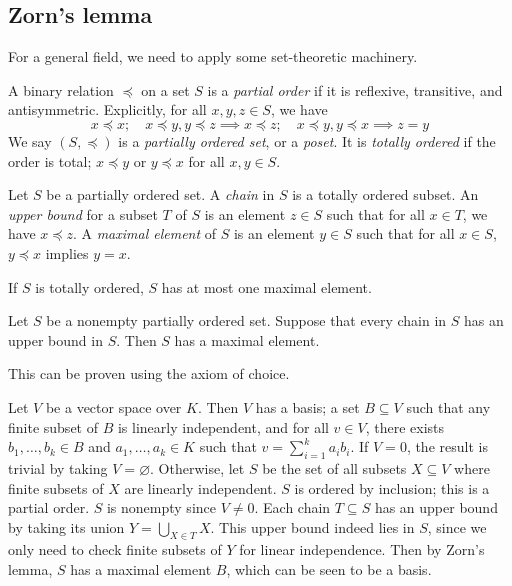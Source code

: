 \subsection{Zorn's lemma}
For a general field, we need to apply some set-theoretic machinery.
\begin{definition}
	A binary relation \( \preceq \) on a set \( S \) is a \emph{partial order} if it is reflexive, transitive, and antisymmetric.
	Explicitly, for all \( x, y, z \in S \), we have
	\[ x \preceq x;\quad x \preceq y, y \preceq z \implies x \preceq z;\quad x \preceq y, y \preceq x \implies z = y \]
	We say \( (S, \preceq) \) is a \emph{partially ordered set}, or a \emph{poset}.
	It is \emph{totally ordered} if the order is total; \( x \preceq y \) or \( y \preceq x \) for all \( x, y \in S \).
\end{definition}
\begin{definition}
	Let \( S \) be a partially ordered set.
	A \emph{chain} in \( S \) is a totally ordered subset.
	An \emph{upper bound} for a subset \( T \) of \( S \) is an element \( z \in S \) such that for all \( x \in T \), we have \( x \preceq z \).
	A \emph{maximal element} of \( S \) is an element \( y \in S \) such that for all \( x \in S \), \( y \preceq x \) implies \( y = x \).
\end{definition}
If \( S \) is totally ordered, \( S \) has at most one maximal element.
\begin{lemma}[Zorn]
	Let \( S \) be a nonempty partially ordered set.
	Suppose that every chain in \( S \) has an upper bound in \( S \).
	Then \( S \) has a maximal element.
\end{lemma}
This can be proven using the axiom of choice.
\begin{example}
	Let \( V \) be a vector space over \( K \).
	Then \( V \) has a basis; a set \( B \subseteq V \) such that any finite subset of \( B \) is linearly independent, and for all \( v \in V \), there exists \( b_1, \dots, b_k \in B \) and \( a_1, \dots, a_k \in K \) such that \( v = \sum_{i=1}^k a_i b_i \).
	If \( V = \qty{0} \), the result is trivial by taking \( V = \varnothing \).
	Otherwise, let \( S \) be the set of all subsets \( X \subseteq V \) where finite subsets of \( X \) are linearly independent.
	\( S \) is ordered by inclusion; this is a partial order.
	\( S \) is nonempty since \( V \neq \qty{0} \).
	Each chain \( T \subseteq S \) has an upper bound by taking its union \( Y = \bigcup_{X \in T} X \).
	This upper bound indeed lies in \( S \), since we only need to check finite subsets of \( Y \) for linear independence.
	Then by Zorn's lemma, \( S \) has a maximal element \( B \), which can be seen to be a basis.
\end{example}
